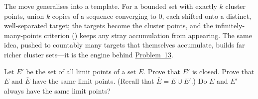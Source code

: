 \documentclass[main.tex]{subfiles}
\begin{document}
\begin{Reflection}
The move generalises into a template. For a bounded set with exactly $k$ cluster points, union $k$ copies of
a sequence converging to $0$, each shifted onto a distinct, well-separated target; the targets become the
cluster points, and the infinitely-many-points criterion () keeps any stray accumulation from appearing. The same idea, pushed to countably many targets that themselves accumulate, builds far richer
cluster sets---it is the engine behind \hyperlink{prob:13}{Problem~13}.
\end{Reflection}

Let $E'$ be the set of all limit points of a set $E$. Prove that $E'$ is closed. Prove that $E$ and
$\overline{E}$ have the same limit points. (Recall that $\overline{E}=E\cup E'$.) Do $E$ and $E'$
always have the same limit points?
\end{document}
